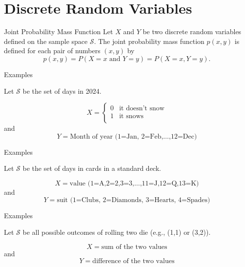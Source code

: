 \section{Discrete Random Variables}

\label{sec:two-discrete-random}

\begin{frame}
  \begin{block}{Joint Probability Mass Function}
    Let $X$ and $Y$ be two discrete random variables defined on the sample space $\mathcal S$. The joint probability mass function $p(x,y)$ is defined for each pair of numbers $(x,y)$ by
    \[
      p(x,y)=P(X=x\mbox{ and } Y=y)=P(X=x,Y=y).
    \]
  \end{block}
\end{frame}

\begin{frame}
  \begin{block}{Examples}
  
  Let $\mathcal S$ be the set of days in 2024.
  
  $$
  X=
  \left\{
  \begin{array}{ll}
  0 & \mbox{it doesn't snow}\\
  1 & \mbox{it snows}\\
  \end{array}
  \right.
  $$
  and
  $$
  Y =\mbox{Month of year (1=Jan, 2=Feb,$\ldots$,12=Dec)}
  $$
  \end{block}
\end{frame}

\begin{frame}
  \begin{block}{Examples}
  
  Let $\mathcal S$ be the set of days in cards in a standard deck.
  
  $$
  X=\mbox{value (1=A,2=2,3=3,$\ldots$,11=J,12=Q,13=K)}
  $$
  and
  $$
  Y =\mbox{suit (1=Clubs, 2=Diamonds, 3=Hearts, 4=Spades)}
  $$
  \end{block}
\end{frame}

\begin{frame}
  \begin{block}{Examples}
  
  Let $\mathcal S$ be all possible outcomes of rolling two die (e.g., (1,1) or (3,2)).
  
  $$
  X=\mbox{sum of the two values}
  $$
  and
  $$
  Y =\mbox{difference of the two values}
  $$
  \end{block}
\end{frame}

